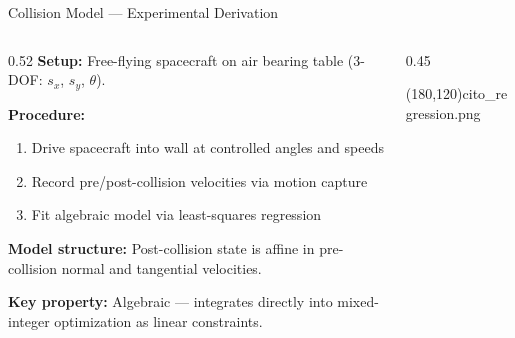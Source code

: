 \begin{frame}{Collision Model --- Experimental Derivation}
  \hypertarget{backup:collision-model}{}
  \footnotesize
  \begin{columns}[c]
    \begin{column}{0.52\textwidth}
      \textbf{Setup:} Free-flying spacecraft on air bearing table (3-DOF: $s_x$, $s_y$, $\theta$).

      \vskip4pt
      \textbf{Procedure:}
      \vskip2pt
      \scriptsize
      \begin{enumerate}
        \item Drive spacecraft into wall at controlled angles and speeds
        \item Record pre/post-collision velocities via motion capture
        \item Fit algebraic model via least-squares regression
      \end{enumerate}

      \vskip2pt
      \footnotesize
      \textbf{Model structure:} Post-collision state is affine in pre-collision normal and tangential velocities.

      \vskip2pt
      \textbf{Key property:} Algebraic --- integrates directly into mixed-integer optimization as linear constraints.
    \end{column}
    \begin{column}{0.45\textwidth}
      \begin{center}
        {\color{slate400}\framebox(180,120){cito\_regression.png}}
      \end{center}
    \end{column}
  \end{columns}
\end{frame}

